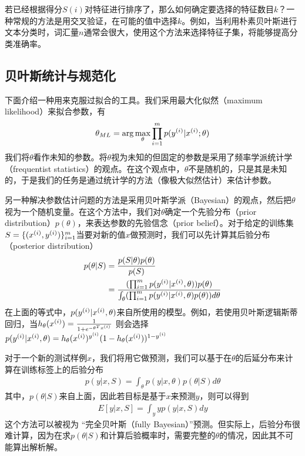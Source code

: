 若已经根据得分$S(i)$对特征进行排序了，那么如何确定要选择的特征数目$k$？一种常规的方法是用交叉验证，在可能的值中选择$k$。例如，当利用朴素贝叶斯进行文本分类时，词汇量$n$通常会很大，使用这个方法来选择特征子集，将能够提高分类准确率。

\subsection{贝叶斯统计与规范化}
下面介绍一种用来克服过拟合的工具。我们采用最大化似然（maximum likelihood）来拟合参数，有
\begin{eqnarray}
\theta_{ML}=\arg\max_\theta\prod_{i=1}^mp({y}^{({i})}|{x}^{({i})};\theta)
\end{eqnarray}
我们将$\theta$看作未知的参数。将$\theta$视为未知的但固定的参数是采用了频率学派统计学（frequentist statistics）的观点。在这个观点中，$\theta$不是随机的，只是其是未知的，于是我们的任务是通过统计学的方法（像极大似然估计）来估计参数。

另一种解决参数估计问题的方法是采用贝叶斯学派（Bayesian）的观点，然后把$\theta$视为一个随机变量。在这个方法中，我们对$\theta$确定一个先验分布（prior distribution）$p(\theta)$，来表达参数的先验信念（prior belief）。对于给定的训练集$S=\{ ({x}^{({i})},{y}^{({i})}) \}^m_{i=1}$当要对新的值$x$做预测时，我们可以先计算其后验分布（posterior distribution）
\begin{eqnarray}
\begin{aligned}
p(\theta|S)&=\frac{p(S|\theta) p(\theta)}{p(S)}\\
&= \frac{(\prod_{i=1}^mp({y}^{({i})}|{x}^{({i})},\theta))p(\theta)}{\int_\theta (\prod_{i=1}^mp({y}^{({i})}|{x}^{({i})},\theta)p(\theta))d\theta }
\end{aligned}
\end{eqnarray}
在上面的等式中，$p({y}^{({i})}|{x}^{({i})},\theta)$来自所使用的模型。例如，若使用贝叶斯逻辑斯蒂回归，当$h_\theta({x}^{({i})})=\frac{1}{1+e^{-\theta^T{x}^{({i})}}}$
则会选择$p({y}^{({i})}|{x}^{({i})},\theta)=h_{\theta}({x}^{({i})})^{{y}^{({i})}}(1-h_\theta ({x}^{({i})}))^{1-{y}^{({i})}}$

对于一个新的测试样例$x$，我们将用它做预测，我们可以基于在$\theta$的后延分布来计算在训练标签上的后验分布
\begin{eqnarray}
p(y|x,S)=\int_\theta p(y|x,\theta)p(\theta|S)d\theta
\end{eqnarray}
其中，$p(\theta|S)$来自上面，因此若目标是基于$x$来预测$y$，则可以得到
\begin{eqnarray}
E[y|x,S]=\int_yyp(y|x,S)dy
\end{eqnarray}
这个方法可以被视为 “完全贝叶斯（fully Bayesian）”预测。但实际上，后验分布很难计算，因为在求$p(\theta|S)$和计算后验概率时，需要完整的$\theta$的情况，因此其不可能算出解析解。

